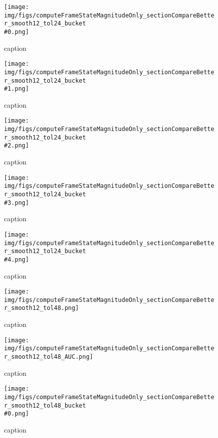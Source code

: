 %
\begin{figure}[!ht]
	\centering
	\texttt{[image: img/figs/computeFrameStateMagnitudeOnly\_sectionCompareBetter\_smooth12\_tol24\_bucket\\\#0.png]}
	\caption{caption}
	\label{fig:computeFrameStateMagnitudeOnly_sectionCompareBetter_smooth12_tol24_bucket\#0.png}
\end{figure}
%
\begin{figure}[!ht]
	\centering
	\texttt{[image: img/figs/computeFrameStateMagnitudeOnly\_sectionCompareBetter\_smooth12\_tol24\_bucket\\\#1.png]}
	\caption{caption}
	\label{fig:computeFrameStateMagnitudeOnly_sectionCompareBetter_smooth12_tol24_bucket\#1.png}
\end{figure}
%
\begin{figure}[!ht]
	\centering
	\texttt{[image: img/figs/computeFrameStateMagnitudeOnly\_sectionCompareBetter\_smooth12\_tol24\_bucket\\\#2.png]}
	\caption{caption}
	\label{fig:computeFrameStateMagnitudeOnly_sectionCompareBetter_smooth12_tol24_bucket\#2.png}
\end{figure}
%
\begin{figure}[!ht]
	\centering
	\texttt{[image: img/figs/computeFrameStateMagnitudeOnly\_sectionCompareBetter\_smooth12\_tol24\_bucket\\\#3.png]}
	\caption{caption}
	\label{fig:computeFrameStateMagnitudeOnly_sectionCompareBetter_smooth12_tol24_bucket\#3.png}
\end{figure}
%
\begin{figure}[!ht]
	\centering
	\texttt{[image: img/figs/computeFrameStateMagnitudeOnly\_sectionCompareBetter\_smooth12\_tol24\_bucket\\\#4.png]}
	\caption{caption}
	\label{fig:computeFrameStateMagnitudeOnly_sectionCompareBetter_smooth12_tol24_bucket\#4.png}
\end{figure}
%
\begin{figure}[!ht]
	\centering
	\texttt{[image: img/figs/computeFrameStateMagnitudeOnly\_sectionCompareBetter\_smooth12\_tol48.png]}
	\caption{caption}
	\label{fig:computeFrameStateMagnitudeOnly_sectionCompareBetter_smooth12_tol48.png}
\end{figure}
%
\begin{figure}[!ht]
	\centering
	\texttt{[image: img/figs/computeFrameStateMagnitudeOnly\_sectionCompareBetter\_smooth12\_tol48\_AUC.png]}
	\caption{caption}
	\label{fig:computeFrameStateMagnitudeOnly_sectionCompareBetter_smooth12_tol48_AUC.png}
\end{figure}
%
\begin{figure}[!ht]
	\centering
	\texttt{[image: img/figs/computeFrameStateMagnitudeOnly\_sectionCompareBetter\_smooth12\_tol48\_bucket\\\#0.png]}
	\caption{caption}
	\label{fig:computeFrameStateMagnitudeOnly_sectionCompareBetter_smooth12_tol48_bucket\#0.png}
\end{figure}

